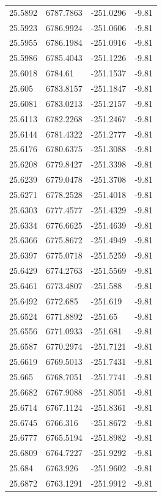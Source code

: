 \begin{table}[H]
\begin{tabular}{llll}
25.5892 & 6787.7863 & -251.0296 & -9.81 \\
25.5923 & 6786.9924 & -251.0606 & -9.81 \\
25.5955 & 6786.1984 & -251.0916 & -9.81 \\
25.5986 & 6785.4043 & -251.1226 & -9.81 \\
25.6018 & 6784.61 & -251.1537 & -9.81 \\
25.605 & 6783.8157 & -251.1847 & -9.81 \\
25.6081 & 6783.0213 & -251.2157 & -9.81 \\
25.6113 & 6782.2268 & -251.2467 & -9.81 \\
25.6144 & 6781.4322 & -251.2777 & -9.81 \\
25.6176 & 6780.6375 & -251.3088 & -9.81 \\
25.6208 & 6779.8427 & -251.3398 & -9.81 \\
25.6239 & 6779.0478 & -251.3708 & -9.81 \\
25.6271 & 6778.2528 & -251.4018 & -9.81 \\
25.6303 & 6777.4577 & -251.4329 & -9.81 \\
25.6334 & 6776.6625 & -251.4639 & -9.81 \\
25.6366 & 6775.8672 & -251.4949 & -9.81 \\
25.6397 & 6775.0718 & -251.5259 & -9.81 \\
25.6429 & 6774.2763 & -251.5569 & -9.81 \\
25.6461 & 6773.4807 & -251.588 & -9.81 \\
25.6492 & 6772.685 & -251.619 & -9.81 \\
25.6524 & 6771.8892 & -251.65 & -9.81 \\
25.6556 & 6771.0933 & -251.681 & -9.81 \\
25.6587 & 6770.2974 & -251.7121 & -9.81 \\
25.6619 & 6769.5013 & -251.7431 & -9.81 \\
25.665 & 6768.7051 & -251.7741 & -9.81 \\
25.6682 & 6767.9088 & -251.8051 & -9.81 \\
25.6714 & 6767.1124 & -251.8361 & -9.81 \\
25.6745 & 6766.316 & -251.8672 & -9.81 \\
25.6777 & 6765.5194 & -251.8982 & -9.81 \\
25.6809 & 6764.7227 & -251.9292 & -9.81 \\
25.684 & 6763.926 & -251.9602 & -9.81 \\
25.6872 & 6763.1291 & -251.9912 & -9.81 \\

\end{tabular}
\end{table}
